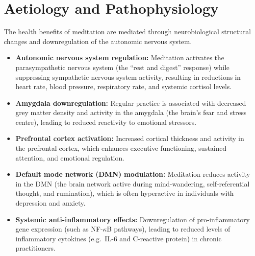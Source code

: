 \section*{Aetiology and Pathophysiology}
The health benefits of meditation are mediated through neurobiological structural changes and downregulation of the autonomic nervous system.
\begin{itemize}
    \item \textbf{Autonomic nervous system regulation:} Meditation activates the parasympathetic nervous system (the ``rest and digest'' response) while suppressing sympathetic nervous system activity, resulting in reductions in heart rate, blood pressure, respiratory rate, and systemic cortisol levels.
    \item \textbf{Amygdala downregulation:} Regular practice is associated with decreased grey matter density and activity in the amygdala (the brain's fear and stress centre), leading to reduced reactivity to emotional stressors.
    \item \textbf{Prefrontal cortex activation:} Increased cortical thickness and activity in the prefrontal cortex, which enhances executive functioning, sustained attention, and emotional regulation.
    \item \textbf{Default mode network (DMN) modulation:} Meditation reduces activity in the DMN (the brain network active during mind-wandering, self-referential thought, and rumination), which is often hyperactive in individuals with depression and anxiety.
    \item \textbf{Systemic anti-inflammatory effects:} Downregulation of pro-inflammatory gene expression (such as NF-$\kappa$B pathways), leading to reduced levels of inflammatory cytokines (e.g.\ IL-6 and C-reactive protein) in chronic practitioners.
\end{itemize}

